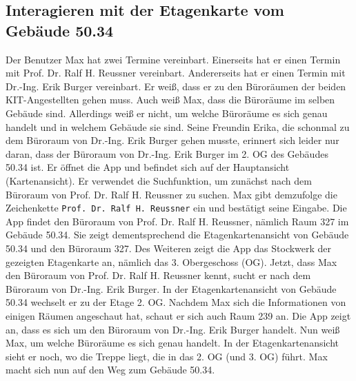 \subsection{Interagieren mit der Etagenkarte vom Gebäude 50.34}

Der \Gls{Benutzer} Max hat zwei Termine vereinbart.
Einerseits hat er einen Termin mit Prof. Dr. Ralf H. Reussner vereinbart.
Andererseits hat er einen Termin mit Dr.-Ing. Erik Burger vereinbart.
Er weiß, dass er zu den Büroräumen der beiden \Gls{KIT}-Angestellten gehen muss.
Auch weiß Max, dass die Büroräume im selben Gebäude sind.
Allerdings weiß er nicht, um welche Büroräume es sich genau handelt und in welchem Gebäude sie sind.
Seine Freundin Erika, die schonmal zu dem Büroraum von Dr.-Ing. Erik Burger gehen musste, erinnert sich leider nur daran, dass der Büroraum von Dr.-Ing. Erik Burger im 2. OG des Gebäudes 50.34 ist.
Er öffnet die App und befindet sich auf der Hauptansicht (\Gls{Kartenansicht}).
Er verwendet die Suchfunktion, um zunächst nach dem Büroraum von Prof. Dr. Ralf H. Reussner zu suchen.
Max gibt demzufolge die \Gls{Zeichenkette} \texttt{Prof. Dr. Ralf H. Reussner} ein und bestätigt seine Eingabe.
Die App findet den Büroraum von Prof. Dr. Ralf H. Reussner, nämlich Raum 327 im Gebäude 50.34.
Sie zeigt dementsprechend die \Gls{Etagenkartenansicht} von Gebäude 50.34 und den Büroraum 327.
Des Weiteren zeigt die App das Stockwerk der gezeigten \Gls{Etagenkarte} an, nämlich das 3. Obergeschoss (OG).
Jetzt, dass Max den Büroraum von Prof. Dr. Ralf H. Reussner kennt, sucht er nach dem Büroraum von Dr.-Ing. Erik Burger. 
In der \Gls{Etagenkartenansicht} von Gebäude 50.34 wechselt er zu der Etage 2. OG.
Nachdem Max sich die Informationen von einigen Räumen angeschaut hat, schaut er sich auch Raum 239 an. 
Die App zeigt an, dass es sich um den Büroraum von Dr.-Ing. Erik Burger handelt.
Nun weiß Max, um welche Büroräume es sich genau handelt.
In der \Gls{Etagenkartenansicht} sieht er noch, wo die Treppe liegt, die in das 2. OG (und 3. OG) führt.
Max macht sich nun auf den Weg zum Gebäude 50.34.
